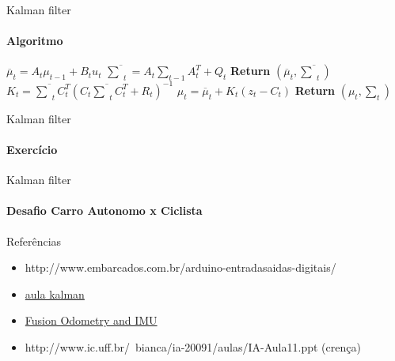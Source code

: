 \documentclass{beamer}
\begin{document}
\begin{frame}[c]{Kalman filter}
    \framesubtitle{Algoritmo}
    \begin{algorithm}[H]
        \caption{Kalman-filter}
        \label{array-sum}
        \begin{algorithmic}[1]
            \State $\overline{\mu}_t = A_t\mu_{t-1} + B_t u_t$
            \State $ \overline{\textstyle\sum}_t = A_t {\textstyle\sum}_{t-1} A_t^T+ Q_t$ 
            \State \textbf{Return} $\left(\overline{\mu}_t, \overline{\textstyle\sum}_t\right)$
        \EndProcedure
            \State $K_t = \overline{\textstyle\sum}_tC_t^T(C_t\overline{\textstyle\sum}_tC_t^T+R_t)^{-1}$
            \State $\mu_t  = \overline{\mu}_t + K_t(z_t -C_t)$
            \State \textbf{Return} $\left(\mu_t, \textstyle\sum_t\right)$
        \EndProcedure
        \end{algorithmic}
    \end{algorithm}
\end{frame}



\begin{frame}[c]{Kalman filter}
    \framesubtitle{Exercício}
\end{frame}


\begin{frame}[c]{Kalman filter}
    \framesubtitle{Desafio Carro Autonomo x Ciclista}
\end{frame}





\begin{frame}[t]{Referências}
    \begin{itemize}
        \item http://www.embarcados.com.br/arduino-entradasaidas-digitais/
        \item \href{https://www.youtube.com/watch?v=DE6Jn2cB4J4&list=PLgnQpQtFTOGQrZ4O5QzbIHgl3b1JHimN_&index=5}{aula kalman} 
        \item \href{https://www.youtube.com/watch?v=QZ5q59H2qaI}{Fusion Odometry and IMU}
        \item http://www.ic.uff.br/~bianca/ia-20091/aulas/IA-Aula11.ppt (crença)
    \end{itemize}
\end{frame}
\end{document}

